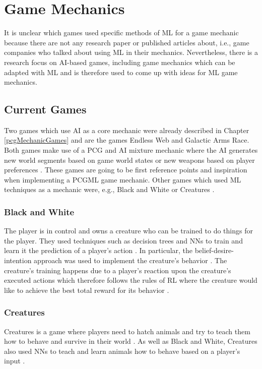 \documentclass[MGS,Master,english]{twbook}%
\begin{document}
\section{Game Mechanics}
It is unclear which games used specific methods of \ac{ML} for a game mechanic because there are not any research paper or published articles about, i.e., game companies who talked about using \ac{ML} in their mechanics. Nevertheless, there is a research focus on \ac{AI}-based games, including game mechanics which can be adapted with \ac{ML} and is therefore used to come up with ideas for \ac{ML} game mechanics. 

\subsection{Current Games}
Two games which use \ac{AI} as a core mechanic were already described in Chapter \ref{pcgMechanicGames} and are the games Endless Web and Galactic Arms Race. Both games make use of a \ac{PCG} and \ac{AI} mixture mechanic where the \ac{AI} generates new world segments based on game world states \cite{pcg::endlessWeb} or new weapons based on player preferences \cite{pcg::galacticArmsRace}. These games are going to be first reference points and inspiration when implementing a \ac{PCGML} game mechanic. Other games which used \ac{ML} techniques as a mechanic were, e.g., Black and White or Creatures \cite{ml::mostInfluentalAiGames}. 

\subsubsection{Black and White}
The player is in control and owns a creature who can be trained to do things for the player. They used techniques such as decision trees and \acp{NN} to train and learn it the prediction of a player's action \cite{ml::gamasutra::ml} \cite{ml::mostInfluentalAiGames}. In particular, the belief-desire-intention approach was used to implement the creature's behavior \cite{ml::mostInfluentalAiGames}. The creature's training happens due to a player’s reaction upon the creature's executed actions which therefore follows the rules of \ac{RL} where the creature would like to achieve the best total reward for its behavior \cite{ml::gamasutra::ml}.

\subsubsection{Creatures}
Creatures is a game where players need to hatch animals and try to teach them how to behave and survive in their world \cite{ml::mostInfluentalAiGames}. As well as Black and White, Creatures also used \acp{NN} to teach and learn animals how to behave based on a player's input \cite{ml::mostInfluentalAiGames}.
\end{document}
